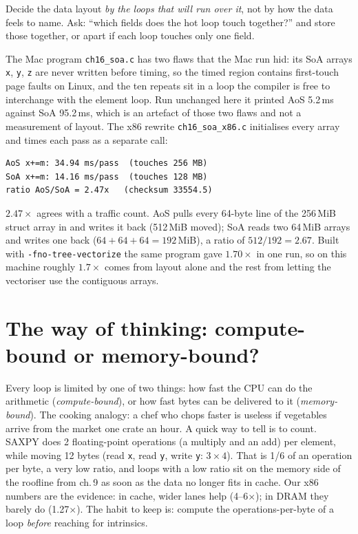 \begin{principle}
Decide the data layout \emph{by the loops that will run over it}, not by
how the data feels to name. Ask: ``which fields does the hot loop touch
together?'' and store those together, or apart if each loop touches only
one field.
\end{principle}


\begin{example}
The Mac program \texttt{ch16\_soa.c} has two flaws that the Mac run
hid: its SoA arrays \texttt{x}, \texttt{y}, \texttt{z} are never
written before timing, so the timed region contains first-touch page
faults on Linux, and the ten repeats sit in a loop the compiler is
free to interchange with the element loop. Run unchanged here it
printed AoS 5.2\,ms against SoA 95.2\,ms, which is an artefact of
those two flaws and not a measurement of layout. The x86 rewrite
\texttt{ch16\_soa\_x86.c} initialises every array and times each pass
as a separate call:
\begin{verbatim}
AoS x+=m: 34.94 ms/pass  (touches 256 MB)
SoA x+=m: 14.16 ms/pass  (touches 128 MB)
ratio AoS/SoA = 2.47x   (checksum 33554.5)
\end{verbatim}
$2.47\times$ agrees with a traffic count. AoS pulls every 64-byte
line of the 256\,MiB struct array in and writes it back (512\,MiB
moved); SoA reads two 64\,MiB arrays and writes one back
($64+64+64=192$\,MiB), a ratio of $512/192=2.67$. Built with
\texttt{-fno-tree-vectorize} the same program gave $1.70\times$ in
one run, so on this machine roughly $1.7\times$ comes from layout
alone and the rest from letting the vectoriser use the contiguous arrays.
\end{example}

\section{The way of thinking: compute-bound or memory-bound?}

Every loop is limited by one of two things: how fast the CPU can do the
arithmetic (\emph{compute-bound}), or how fast bytes can be delivered
to it (\emph{memory-bound}). The cooking analogy: a chef who chops
faster is useless if vegetables arrive from the market one crate an
hour. A quick way to tell is to count. SAXPY does 2 floating-point
operations (a multiply and an add) per element, while moving 12 bytes
(read \texttt{x}, read \texttt{y}, write \texttt{y}: $3\times4$).
That is 1/6 of an operation per byte, a very low ratio, and loops with
a low ratio sit on the memory side of the roofline from ch.\,9
as soon as the data no longer fits in cache. Our x86 numbers are the
evidence: in cache, wider lanes help (4--6$\times$); in DRAM they
barely do (1.27$\times$). The habit to keep is: compute the
operations-per-byte of a loop \emph{before} reaching for intrinsics.

